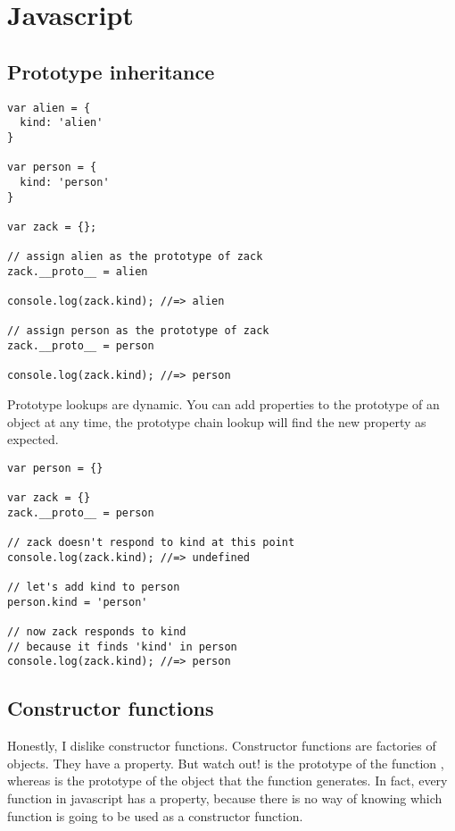 \section{Javascript}



\subsection{Prototype inheritance}

\begin{lstlisting}
var alien = {
  kind: 'alien'
}

var person = {
  kind: 'person'
}

var zack = {};

// assign alien as the prototype of zack
zack.__proto__ = alien

console.log(zack.kind); //=> alien

// assign person as the prototype of zack
zack.__proto__ = person

console.log(zack.kind); //=> person   
\end{lstlisting}

Prototype lookups are dynamic. You can add properties to the prototype of an object at any time, the prototype chain lookup will find the new property as expected.

\begin{lstlisting}
var person = {}

var zack = {}
zack.__proto__ = person

// zack doesn't respond to kind at this point
console.log(zack.kind); //=> undefined

// let's add kind to person
person.kind = 'person'

// now zack responds to kind
// because it finds 'kind' in person
console.log(zack.kind); //=> person
\end{lstlisting}

\subsection{Constructor functions}

Honestly, I dislike constructor functions. 
Constructor functions are factories of objects. They have a   property. But watch out! 
 is the prototype of the function , whereas   is the prototype of the object that the function generates.
In fact, every function in javascript has a   property, because there is no way of knowing which function is going to be used as a constructor function. 


